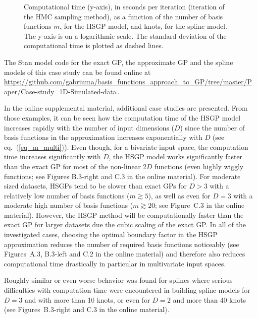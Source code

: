 \begin{figure}[!h]
\centering
{}
\caption{Computational time (y-axis), in seconds per iteration (iteration of the HMC sampling method), as a function of the number of basis functions $m$, for the HSGP model, and knots, for the spline model. The y-axis is on a logarithmic scale. The standard deviation of the computational time is plotted as dashed lines.}
  \label{fig14_time_exI}
\end{figure}


The Stan model code for the exact GP, the approximate GP and the spline models of this case study can be found online at {\small \url{ https://github.com/gabriuma/basis_functions_approach_to_GP/tree/master/Paper/Case-study_1D-Simulated-data}}\,.

In the online supplemental material, additional case studies are presented. From those examples, it can be seen how the computation time of the HSGP model increases rapidly with the number of input dimensions ($D$) since the number of basis functions in the approximation increases exponentially with $D$ (see eq.~(\ref{eq_m_multi})). Even though, for a bivariate input space, the computation time increases significantly with $D$, the HSGP model works significantly faster than the exact GP for most of the non-linear $2D$ functions (even highly wiggly functions; see Figures B.3-right and C.3 in the online material). For moderate sized datasets, HSGPs tend to be slower than exact GPs for $D>3$ with a relatively low number of basis functions ($m \gtrsim 5$), as well as even for $D=3$ with a moderate high number of basis functions ($m \gtrsim 20$; see Figure~C.3 in the online material). However, the HSGP method will be computationally faster than the exact GP for larger datasets due the cubic scaling of the exact GP. In all of the investigated cases, choosing the optimal boundary factor in the HSGP approximation reduces the number of required basis functions noticeably (see Figures~A.3, B.3-left and C.2 in the online material) and therefore also reduces computational time drastically in particular in multivariate input spaces.

Roughly similar or even worse behavior was found for splines where serious difficulties with computation time were encountered in building spline models for $D=3$ and with more than 10 knots, or even for $D=2$ and more than 40 knots (see Figures~B.3-right and C.3 in the online material).


